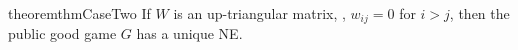 \begin{restatable}{theorem}{thmCaseTwo}
\label{thm:case:2}
If $W$ is an up-triangular matrix, \ie, $w_{ij}=0$ for $i>j$, then the public good game $G$ has a unique NE.
\end{restatable}